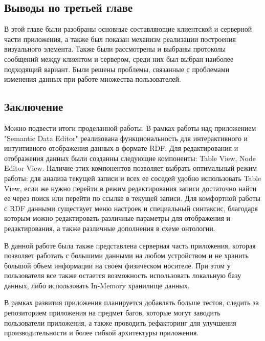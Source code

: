 \documentclass[12pt]{article}
\newcommand{\anonsection}[1]{\section*{#1}\addcontentsline{toc}{section}{#1}}
\begin{document}
\subsection{Выводы по третьей главе}
\qquad В этой главе были разобраны основные составляющие клиентской и серверной части приложения, а также был показан механизм реализации построения визуального элемента. Также были рассмотрены и выбраны протоколы сообщений между клиентом и сервером, среди них был выбран наиболее подходящий вариант. Были решены проблемы, связанные с проблемами изменения данных при работе множества пользователей.

\pagebreak

\sectionfont{\centering}
\begin{center}
    {\anonsection{Заключение}}
\end{center}

Можно подвести итоги проделанной работы. В рамках работы над приложением "Semantic Data Editor" реализована функциональность для интерактивного и интуитивного отображения данных в формате RDF. Для редактирования и отображения данных были созданны следующие компоненты: Table View, Node Editor View. Наличие этих компонентов позволяет выбрать оптимальный режим работы: для анализа текущей записи и всех ее соседей удобно использовать Table View, если же нужно перейти в режим редактирования записи достаточно найти ее через поиск или перейти по ссылке в текущей записи. Для комфортной работы с RDF данными существует меню настроек и специальный синтаксис, благодаря которым можно редактировать различные параметры для отображения и редактирования, а также различные дополнения в схеме онтологии.\par

В данной работе была также представлена серверная часть приложения, которая позволяет работать с большими данными на любом устройством и не хранить большой объем информации на своем физическом носителе. При этом у пользователя все также остается возможность использовать локальную базу данных, либо использовать In-Memory хранилище данных.\par

В рамках развития приложения планируется добавлять больше тестов, следить за репозиторием приложения на предмет багов, которые могут заводить пользователи приложения, а также проводить рефакторинг для улучшения производительности и более гибкой архитектуры приложения.\par
\end{document}
